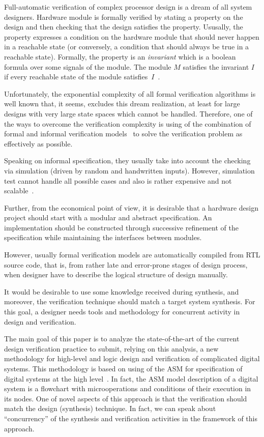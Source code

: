 \begin{multicols}{2}
    Full-automatic verification of complex processor design is a dream of all system designers. Hardware
module is formally verified by stating a property on the design and then checking that the design satisfies the
property. Ususally, the property expresses a condition on the hardware
module that should never happen in a reachable state (or conversely, a condition that should always be true in a
reachable state). Formally, the property is an \textit{invariant} which
is a boolean formula over some signals of the module. The module
$M$ satisfies the invariant $I$ if every reachable state of the module satisfies~$I$~\cite{2bar}.

   Unfortunately, the exponential complexity of all formal verification algorithms
is well known that, it
seems, excludes this dream realization, at least for large designs with
very large state spaces which cannot be
handled. Therefore, one of the ways to overcome the verification complexity is using of the combination of
formal and informal verification models~\cite{3bar} to solve the verification problem as effectively as possible.

   Speaking on informal specification, they usually take into account the checking via simulation (driven by
random and handwritten inputs). However, simulation test cannot handle all possible cases
and also is rather
expensive and not scalable~\cite{4bar}.

    Further, from the economical point of view, it is desirable that a hardware design project should start with a
modular and abstract specification. An implementation should be constructed through successive refinement of
the specification while maintaining the interfaces between modules.

    However, usually formal verification models are auto\-mati\-cal\-ly compiled from RTL source code, 
    that is, from rather late and error-prone stages of design proc\-ess, when designer have to describe the
logical structure of design  manually.

    It would be desirable to use some knowledge received during synthesis, and moreover, the verification
technique should match a target system synthesis. For this goal, a designer needs tools and methodology for
concurrent activity in design and verification.

    The main goal of this paper is to analyze the state-of-the-art of the current design verification practice to
submit, relying on this analysis, a new methodology for high-level and logic design and verification of
complicated digital systems. This methodology is based on using of the ASM for
specification of digital systems at the high level~\cite{5bar}. In fact, the ASM model description of a digital
system is a flowchart with microoperations and conditions of their execution in its nodes. One of novel aspects
of this approach is that the verification should match the design (synthesis) technique. In fact, we can speak
about ``concurrency'' of the synthesis and verification activities in the framework of this approach.



\end{multicols}
